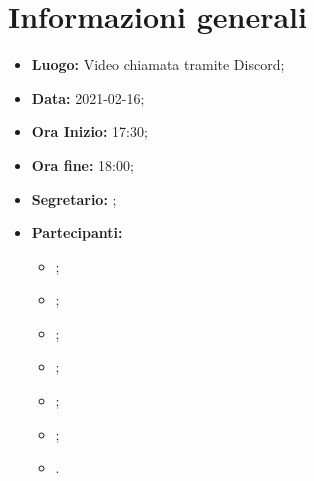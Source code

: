 \section{Informazioni generali}
	\begin{itemize}
		\item \textbf{Luogo:} Video chiamata tramite Discord;
		\item \textbf{Data:} 2021-02-16;
		\item \textbf{Ora Inizio:} 17:30;
		\item \textbf{Ora fine:} 18:00;
		\item \textbf{Segretario:} \NM;
		\item \textbf{Partecipanti:}
		\begin{itemize}
			\item \MB;
			\item \VAS;
			\item \FD;
			\item \NM;
			\item \SB;
			\item \GB;
			\item \MDI.
		\end{itemize}
		
	\end{itemize}